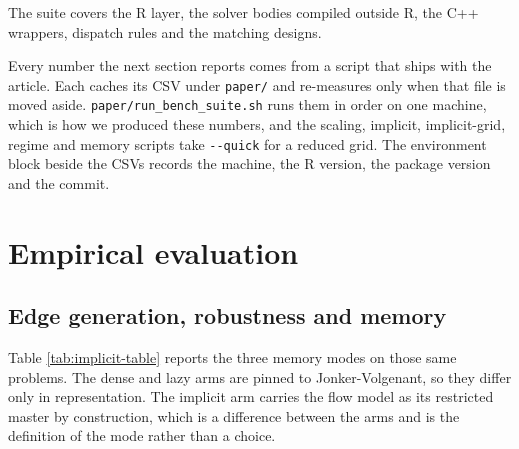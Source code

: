 The suite covers the R layer, the solver bodies compiled outside R, the C++
wrappers, dispatch rules and the matching designs.

Every number the next section reports comes from a script that ships with the
article. Each caches its CSV under \texttt{paper/} and re-measures only when that file is moved aside. \texttt{paper/run\_bench\_suite.sh} runs them in order on one machine,
which is how we produced these numbers, and the scaling, implicit,
implicit-grid, regime and memory scripts take \texttt{-\/-quick} for a reduced grid. The
environment block beside the CSVs records the machine, the R version, the
package version and the commit.

\section{Empirical evaluation}\label{empirical-evaluation}

\subsection{Edge generation, robustness and memory}\label{edge-generation-robustness-and-memory}

Table \ref{tab:implicit-table} reports the three memory modes on those same
problems. The dense and lazy arms are pinned to Jonker-Volgenant, so they differ only in representation. The implicit arm carries the flow model as its
restricted master by construction, which is a difference between the arms and is
the definition of the mode rather than a choice.

